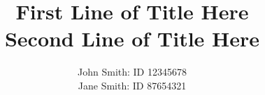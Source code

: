 \title{
First Line of Title Here
\\
Second Line of Title Here
\\
}
\author{
John Smith: ID 12345678
\\
Jane Smith: ID 87654321
\\
}
